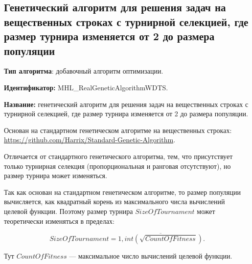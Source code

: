 \subsection{Генетический алгоритм для решения задач на вещественных строках с турнирной селекцией, где размер турнира изменяется от 2 до размера популяции}\label{HarrixOptimizationAlgorithms:MHL_RealGeneticAlgorithmWDTS}

\textbf{Тип алгоритма}: добавочный алгоритм оптимизации.

\textbf{Идентификатор:} MHL\_RealGeneticAlgorithmWDTS.

\textbf{Название:} генетический алгоритм для решения задач на вещественных строках с турнирной селекцией, где размер турнира изменяется от 2 до размера популяции.

Основан на стандартном генетическом алгоритме на вещественных строках:  \href{https://github.com/Harrix/Standard-Genetic-Algorithm}{https://github.com/Harrix/Standard-Genetic-Algorithm}. 

Отличается от стандартного генетического алгоритма, тем, что присутствует только турнирная селекция (пропорциональная и ранговая отсутствуют), но размер турнира может изменяться.

Так как основан на стандартном генетическом алгоритме, то размер популяции вычисляется, как квадратный корень из максимального числа вычислений целевой функции. Поэтому размер турнира $SizeOfTournament$ может теоретически  изменяться в пределах:

\begin{equation}
SizeOfTournament = \overline{1,int\left( \sqrt{CountOfFitness}\right) }.
\end{equation}

Тут $CountOfFitness$ --- максимальное число вычислений целевой функции.

